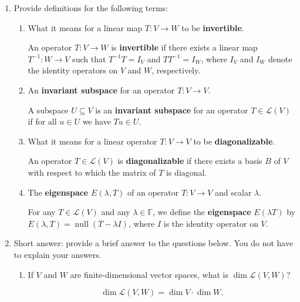 \documentclass[12pt]{article}
\newcommand{\points}[1]{\marginpar{\hspace{24pt}[#1]}}
\DeclareMathOperator{\nul}{null}
\begin{document}
\begin{enumerate}
\item Provide definitions for the following terms:
\begin{enumerate}
 \item What it means for a linear map $T:V\to W$ to be {\bf invertible}. \points{2}

\bigskip

An operator $T:V\to W$ is {\bf invertible} if there exists a linear map $T^{-1}:W\to V$ such that $T^{-1}T = I_V$ and $TT^{-1}=I_W$, where $I_V$ and $I_W$ denote the identity operators on $V$ and $W$, respectively.

\bigskip
 
 \item An {\bf invariant subspace} for an operator $T:V\to V$. \points{2}

\bigskip

A subspace $U\subseteq V$ is an {\bf invariant subspace} for an operator $T\in\mathcal{L}(V)$ if for all $u\in U$ we have $Tu\in U$.

\bigskip

 \item What it means for a linear operator $T:V\to V$ to be {\bf diagonalizable}.\points{2}

\bigskip

An operator $T\in\mathcal{L}(V)$ is {\bf diagonalizable} if there exists a basis $B$ of $V$ with respect to which the matrix of $T$ is diagonal.

\bigskip

 \item The {\bf eigenspace} $E(\lambda, T)$ of an operator $T:V\to V$ and scalar $\lambda$.\points{2}

\bigskip

For any $T\in\mathcal{L}(V)$ and any $\lambda\in\mathbb{F}$, we define the {\bf eigenspace} $E(\lambda T)$ by $E(\lambda, T) = \nul(T-\lambda I)$, where $I$ is the identity operator on $V$.
\end{enumerate}
\newpage

\item Short answer: provide a brief answer to the questions below. You do not have to explain your answers.
\begin{enumerate}
 \item If $V$ and $W$ are finite-dimensional vector spaces, what is $\dim\mathcal{L}(V,W)$?\points{1}

\bigskip

\[
\dim\mathcal{L}(V,W) = \dim V\cdot \dim W. 
\]


\end{enumerate}
\end{enumerate}
\end{document}
